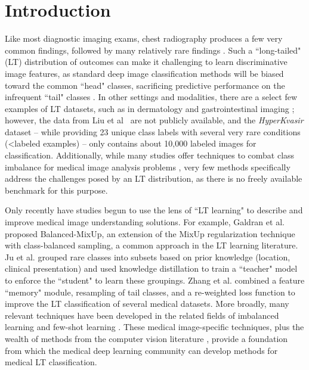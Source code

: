 \documentclass[runningheads]{llncs}
\begin{document}
\section{Introduction}
\raggedbottom

Like most diagnostic imaging exams, chest radiography produces a few very common findings, followed by many relatively rare findings \cite{Paul2021Zeroshot,Zhou2021Review}. Such a ``long-tailed" (LT) distribution of outcomes can make it challenging to learn discriminative image features, as standard deep image classification methods will be biased toward the common ``head" classes, sacrificing predictive performance on the infrequent ``tail" classes \cite{zhang2021deep}. In other settings and modalities, there are a select few examples of LT datasets, such as in dermatology \cite{liu2020deep} and gastrointestinal imaging \cite{borgli2020hyperkvasir}; however, the data from Liu et al~\cite{liu2020deep} are not publicly available, and the \textit{HyperKvasir} dataset \cite{borgli2020hyperkvasir} -- while providing 23 unique class labels with several very rare conditions (\textless  labeled examples) -- only contains about 10,000 labeled images for classification. Additionally, while many studies offer techniques to combat class imbalance for medical image analysis problems \cite{marrakchifighting2021,zhuangcare2019,linautomated2021,galdranbalanced2021}, very few methods specifically address the challenges posed by an LT distribution, as there is no freely available benchmark for this purpose.

Only recently have studies begun to use the lens of ``LT learning" to describe and improve medical image understanding solutions. For example, Galdran et al. \cite{galdranbalanced2021} proposed Balanced-MixUp, an extension of the MixUp \cite{zhang2018mixup} regularization technique with class-balanced sampling, a common approach in the LT learning literature. Ju et al. \cite{jurelational2021} grouped rare classes into subsets based on prior knowledge (location, clinical presentation) and used knowledge distillation to train a ``teacher" model to enforce the ``student" to learn these groupings. Zhang et al. \cite{zhangmbnm2021} combined a feature ``memory" module, resampling of tail classes, and a re-weighted loss function to improve the LT classification of several medical datasets. More broadly, many relevant techniques have been developed in the related fields of imbalanced learning \cite{zhuangcare2019,marrakchifighting2021} and few-shot learning \cite{quellecautomatic2020,lidifficulty2020}. These medical image-specific techniques, plus the wealth of methods from the computer vision literature \cite{chawla2002smote,huang2016learning,wang2017learning,linfocal2017,cuiclass2019,caolearning2019,shu2019meta,kangdecoupling2020,zhang2021deep,jiang2021self,park2021influence,kini2021label}, provide a foundation from which the medical deep learning community can develop methods for medical LT classification.
\end{document}

